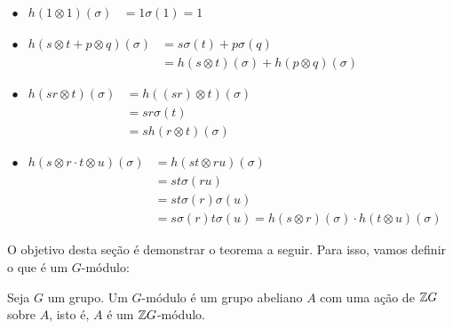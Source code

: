 \vspace{0.3cm}
$\begin{array}{rrl}
    \bullet & h(1\otimes 1)(\sigma) &= 1\sigma(1) = 1
\end{array}$

\vspace{0.3cm}

$\begin{array}{rrl}
    \bullet & h(s\otimes t + p \otimes q)(\sigma) &= s\sigma(t)+p\sigma(q) \\
    & &= h(s\otimes t)(\sigma) +h(p\otimes q)(\sigma)
\end{array}$

\vspace{0.3cm}

$\begin{array}{rrl}
    \bullet & h(s r\otimes t)(\sigma) &= h ((sr) \otimes t)(\sigma)  \\
    & &= sr\sigma(t) \\
    & &= s h(r\otimes t)(\sigma)
\end{array}$

\vspace{0.3cm}

$\begin{array}{rrl}
    \bullet & h(s\otimes r \cdot t \otimes u)(\sigma) &= h(st \otimes ru)(\sigma) \\
    & &= st\sigma(ru) \\
    & &=st\sigma(r)\sigma(u) \\
    & &=s\sigma(r)t\sigma(u) =h(s\otimes r)(\sigma)\cdot h(t\otimes u)(\sigma)
\end{array}$

\vspace{0.3cm}

O objetivo desta seção é demonstrar o teorema a seguir. Para isso, vamos definir o que é um $G$-módulo:

\begin{defn}
Seja $G$ um grupo. Um $G$-módulo é um grupo abeliano $A$ com uma ação de $\mathbb{Z} G$ sobre $A$, isto é, $A$ é um $\mathbb{Z} G$-módulo.
\end{defn}

